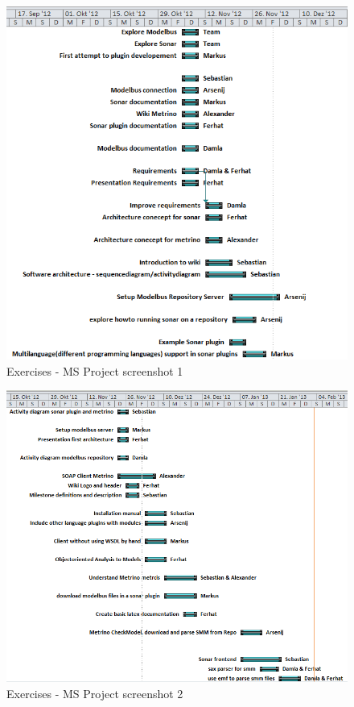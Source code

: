 \begin{figure}[htb]
\begin{center}
\includegraphics[width=\textwidth]{msp_part1}
\caption{Exercises - MS Project screenshot 1}
\end{center}
\end{figure}

\newpage

\begin{figure}[htb]
\begin{center}
\includegraphics[width=\textwidth]{msp_part2}
\caption{Exercises - MS Project screenshot 2}
\end{center}
\end{figure}

